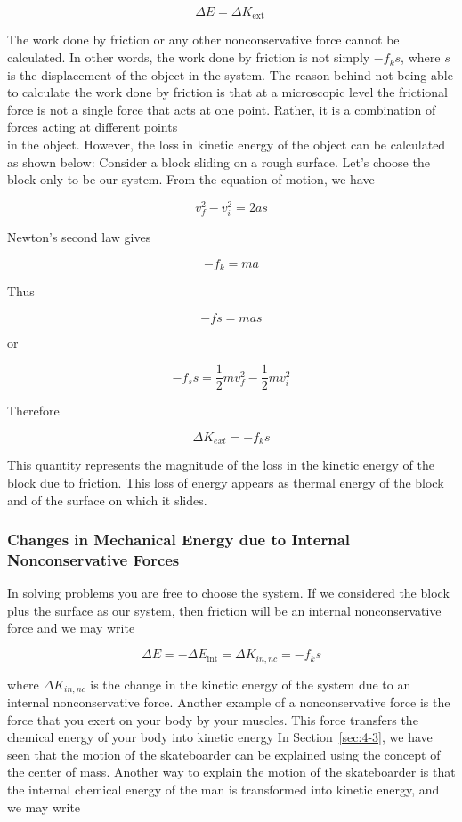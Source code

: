 \documentclass[10pt]{article}
\numberwithin{equation}{section}
\begin{document}
$$
\Delta E=\Delta K_{\text {ext }}
$$

The work done by friction or any other nonconservative force cannot be calculated. In other words, the work done by friction is not simply $-f_{k} s$, where $s$ is the displacement of the object in the system. The reason behind not being able to calculate the work done by friction is that at a microscopic level the frictional force is not a single force that acts at one point. Rather, it is a combination of forces acting at different points\\
in the object. However, the loss in kinetic energy of the object can be calculated as shown below: Consider a block sliding on a rough surface. Let's choose the block only to be our system. From the equation of motion, we have

$$
v_{f}^{2}-v_{i}^{2}=2 a s
$$

Newton's second law gives

$$
-f_{k}=m a
$$

Thus

$$
-f s=m a s
$$

or

$$
-f_{s} s=\frac{1}{2} m v_{f}^{2}-\frac{1}{2} m v_{i}^{2}
$$

Therefore

$$
\Delta K_{e x t}=-f_{k} s
$$

This quantity represents the magnitude of the loss in the kinetic energy of the block due to friction. This loss of energy appears as thermal energy of the block and of the surface on which it slides.

\subsubsection{Changes in Mechanical Energy due to Internal Nonconservative Forces}\label{sec:4-5-3}
In solving problems you are free to choose the system. If we considered the block plus the surface as our system, then friction will be an internal nonconservative force and we may write

$$
\Delta E=-\Delta E_{\mathrm{int}}=\Delta K_{i n, n c}=-f_{k} s
$$

where $\Delta K_{i n, n c}$ is the change in the kinetic energy of the system due to an internal nonconservative force. Another example of a nonconservative force is the force that you exert on your body by your muscles. This force transfers the chemical energy of your body into kinetic energy In Section~\ref{sec:4-3}, we have seen that the motion of the skateboarder can be explained using the concept of the center of mass. Another way to explain the motion of the skateboarder is that the internal chemical energy of the man is transformed into kinetic energy, and we may write
\end{document}
